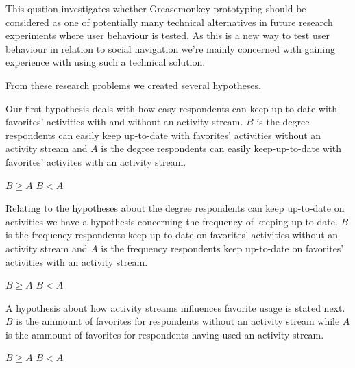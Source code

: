This qustion investigates whether Greasemonkey prototyping should be
considered as one of potentially many technical alternatives in future
research experiments where user behaviour is tested. As this is a new way
to test user behaviour in relation to social navigation we're mainly concerned
with gaining experience with using such a technical solution.

\parabreak

From these research problems we created several hypotheses.

Our first hypothesis deals with how easy respondents can keep-up-to
date with favorites' activities with and without an 
activity stream.
$B$ is the degree respondents can easily keep up-to-date with
favorites' activities without an activity stream and $A$ is the degree
respondents can easily keep-up-to-date with favorites' activites  with
an activity stream.
\begin{items}
   $B \geq A$
   $B < A$
\end{items}

Relating to the hypotheses about the degree respondents can keep
up-to-date on activities we have a hypothesis concerning
the frequency of keeping up-to-date.
$B$ is the frequency respondents keep up-to-date on favorites' activities
without an activity stream and $A$ is the frequency respondents keep
up-to-date on favorites' activities with an activity stream.
\begin{items}
   $B \geq A$
   $B < A$
\end{items}

A hypothesis about how activity streams influences favorite usage is stated
next.
$B$ is the ammount of favorites for respondents without an activity stream
while $A$ is the ammount of favorites for respondents having used an activity
stream.
\begin{items}
   $B \geq A$
   $B < A$
\end{items}
